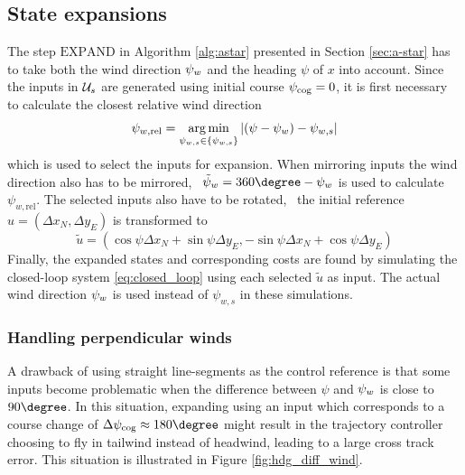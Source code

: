 \subsection{State expansions}
The step $\text{EXPAND}$ in Algorithm \ref{alg:astar} presented in Section \ref{sec:a-star} has to take both the wind direction $\psi_w$ and the heading $\psi$ of $x$ into account. 
Since the inputs in $\mathcal{U}_s$ are generated using initial course $\psi_{\text{cog}}=0$, it is first necessary to calculate the closest relative wind direction
\begin{equation}
    \psi_{w,\text{rel}}=\operatorname*{arg\,\text{min}}_{\psi_{w,s}\in\{\psi_{w,s}\}}|(\psi-\psi_w)-\psi_{w,s}|
\end{equation}
which is used to select the inputs for expansion. When mirroring inputs the wind direction also has to be mirrored, \ie\ 
$\tilde{\psi}_w=360\degree-\winddir$ is used to calculate $\psi_{w,\text{rel}}$. The selected inputs also have to be rotated, \ie\ the initial reference $u=(\Delta x_N, \Delta y_E)$ is transformed to 
\begin{equation}
    \tilde{u}=(\cos\psi \Delta x_N + \sin\psi \Delta y_E, -\sin\psi \Delta x_N + \cos\psi \Delta y_E)
\end{equation}
Finally, the expanded states and corresponding costs are found by simulating the closed-loop system \eqref{eq:closed_loop} using each selected $\tilde{u}$ as input. 
The actual wind direction $\psi_w$ is used instead of $\psi_{w,s}$ in these simulations.

\subsubsection{Handling perpendicular winds}
A drawback of using straight line-segments as the control reference is that some inputs become problematic when the difference between 
$\psi$ and $\psi_w$ is close to $90 \degree$. In this situation, expanding using an input which corresponds to a course change 
 of $\Delta\cog\approx180\degree$ might result in the trajectory controller choosing to fly in tailwind instead of headwind, leading to a large cross track error. This situation is 
 illustrated in Figure \ref{fig:hdg_diff_wind}.

